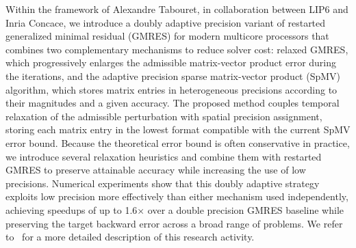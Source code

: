 Within the framework of Alexandre Tabouret, in collaboration between LIP6 and Inria Concace, we introduce a doubly adaptive precision variant of restarted generalized minimal residual (GMRES) for modern multicore processors that combines two complementary mechanisms to reduce solver cost: relaxed GMRES, which progressively enlarges the admissible matrix-vector product error during the iterations, and the adaptive precision sparse matrix-vector product (SpMV) algorithm, which stores matrix entries in heterogeneous precisions according to their magnitudes and a given accuracy. The proposed method couples temporal relaxation of the admissible perturbation with spatial precision assignment, storing each matrix entry in the lowest format compatible with the current SpMV error bound. Because the theoretical error bound is often conservative in practice, we introduce several relaxation heuristics and combine them with restarted GMRES to preserve attainable accuracy while increasing the use of low precisions. Numerical experiments show that this doubly adaptive strategy exploits low precision more effectively than either mechanism used independently, achieving speedups of up to 1.6× over a double precision GMRES baseline while preserving the target backward error across a broad range of problems.
We refer to~\cite{hal_05640635} for a more detailed description of this research activity.

